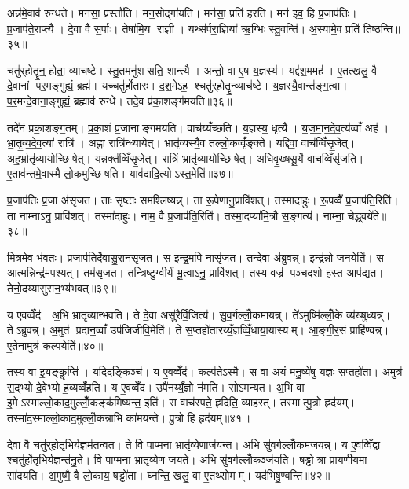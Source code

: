 अन्न॑मे॒वाव॑ रुन्धते। मन॑सा॒ प्रस्तौ॑ति। मन॒सोद्गा॑यति। मन॑सा॒ प्रति॑ हरति। मन॑ इव॒ हि प्र॒जाप॑तिः। प्र॒जाप॑ते॒राप्त्यै। दे॒वा वै स॒र्पाः। तेषा॑मि॒य राज्ञी। यथ्स॑र्परा॒ज्ञिया॑ ऋ॒ग्भिः स्तु॒वन्ति॑। अ॒स्यामे॒व प्रति॑ तिष्ठन्ति॥३५॥

चतु॑र्‌होतॄ॒न्॒ होता॒ व्याच॑ष्टे। स्तु॒तमनु॑शसति॒ शान्त्यै। अन्तो॒ वा ए॒ष य॒ज्ञस्य॑। यद्द॑श॒ममह॑। ए॒तत्खलु॒ वै दे॒वानां पर॒मङ्गुह्यं॒ ब्रह्म॑। यच्चतु॑र्होतारः। द॒श॒मेऽह॒ श्चतु॑र्‌होतॄ॒न्व्याच॑ष्टे। य॒ज्ञस्यै॒वान्त॑ङ्ग॒त्वा। प॒र॒मन्दे॒वाना॒ङ्गुह्यं॒ ब्रह्माव॑ रुन्धे। तदे॒व प्र॑का॒शङ्ग॑मयति॥३६॥

तदे॑नं प्रका॒शङ्ग॒तम्। प्र॒का॒शं प्र॒जानाङ्गमयति। वाच॑य्यँच्छति। य॒ज्ञस्य॒ धृत्यै। य॒ज॒मा॒न॒दे॒व॒त्य॑व्वाँ अह॑। भ्रा॒तृ॒व्य॒दे॒व॒त्या॑ रात्रि॑। अह्ना॒ रात्रि॑न्ध्यायेत्। भ्रातृ॑व्यस्यै॒व तल्लो॒कव्वृँ॑ङ्क्ते। यद्दिवा॒ वाच॑व्विँसृ॒जेत्। अह॒र्भ्रातृ॑व्या॒योच्छिषेत्। यन्नक्त॑व्विँसृ॒जेत्। रात्रिं॒ भ्रातृ॑व्या॒योच्छिषेत्। अ॒धि॒वृ॒ख्ष॒सू॒र्ये वाच॒व्विँसृ॑जति। ए॒ताव॑न्तमे॒वास्मै॑ लो॒कमुच्छिषति। याव॑दादि॒त्योऽस्त॒मेति॑॥३७॥\anuvakamend[पृश्ञि॑ तिष्ठन्ति गमयति शिषे॒त्पञ्च॑ च]

प्र॒जाप॑तिः प्र॒जा अ॑सृजत। ताः सृ॒ष्टाः सम॑श्लिष्यन्न्। ता रू॒पेणानु॒प्रावि॑शत्। तस्मा॑दाहुः। रू॒पव्वैँ प्र॒जाप॑ति॒रिति॑। ता नाम्नाऽनु॒ प्रावि॑शत्। तस्मा॑दाहुः। नाम॒ वै प्र॒जाप॑ति॒रिति॑। तस्मा॒दप्या॑मि॒त्रौ स॒ङ्गत्य॑। नाम्ना॒ चेद्ध्वये॑ते॥३८॥

मि॒त्रमे॒व भ॑वतः। प्र॒जाप॑तिर्देवासु॒रान॑सृजत। स इन्द्र॒मपि॒ नासृ॑जत। तन्दे॒वा अ॑ब्रुवन्न्। इन्द्र॑न्नो जन॒येति॑। स आ॒त्मन्निन्द्र॑मपश्यत्। तम॑सृजत। तन्त्रि॒ष्टुग्वी॒र्यं॑ भू॒त्वाऽनु॒ प्रावि॑शत्। तस्य॒ वज्र॑ पञ्चद॒शो हस्त॒ आप॑द्यत। तेनो॒दय्यासु॑रान॒भ्य॑भवत्॥३९॥

य ए॒वव्वेँद॑। अ॒भि भ्रातृ॑व्यान्भवति। ते दे॒वा असु॑रैर्वि॒जित्य॑। सु॒व॒र्गल्लोँ॒कमा॑यन्न्। ते॑ऽमुष्मि॑ल्लोँ॒के व्य॑ख्षुध्यन्न्। तेऽब्रुवन्न्। अ॒मुत॑ प्रदान॒व्वाँ उप॑जिजीवि॒मेति॑। ते स॒प्तहो॑तारय्यँ॒ज्ञव्विँ॒धाया॒यास्यम्। आ॒ङ्गी॒र॒सं प्राहि॑ण्वन्न्। ए॒तेना॒मुत्र॑ कल्प॒येति॑॥४०॥

तस्य॒ वा इ॒यङ्कॢप्ति॑। यदि॒दङ्किञ्च॑। य ए॒वव्वेँद॑। कल्प॑तेऽस्मै। स वा अ॒यं म॑नु॒ष्ये॑षु य॒ज्ञः स॒प्तहो॑ता। अ॒मुत्र॑ स॒द्भ्यो दे॒वेभ्यो॑ ह॒व्यव्वँ॑हति। य ए॒वव्वेँद॑। उपै॑नय्यँ॒ज्ञो न॑मति। सो॑ऽमन्यत। अ॒भि वा इ॒मेऽस्माल्लो॒काद॒मुल्लोँ॒कङ्क॑मिष्यन्त॒ इति॑। स वाच॑स्पते॒ हृदिति॒ व्याह॑रत्। तस्मात्पु॒त्रो हृद॑यम्। तस्मा॑द॒स्माल्लो॒काद॒मुल्लोँ॒कन्नाभि का॑मयन्ते। पु॒त्रो हि हृद॑यम्॥४१॥\anuvakamend[ह्वये॑ते अभवत्कल्प॒येतीति॑ च॒त्वारि॑ च]

दे॒वा वै चतु॑र्‌होतृभिर्य॒ज्ञम॑तन्वत। ते वि पा॒प्मना॒ भ्रातृ॑व्ये॒णाज॑यन्त। अ॒भि सु॑व॒र्गल्लोँ॒कम॑जयन्न्। य ए॒वव्विँ॒द्वा श्चतु॑र्होतृभिर्य॒ज्ञन्त॑नु॒ते। वि पा॒प्मना॒ भ्रातृ॑व्येण जयते। अ॒भि सु॑व॒र्गल्लोँ॒कञ्ज॑यति। षड्ढोत्रा प्राय॒णीय॒मा सा॑दयति। अ॒मुष्मै॒ वै लो॒काय॒ षड्ढो॑ता। घ्नन्ति॒ खलु॒ वा ए॒तथ्सोमम्। यद॑भिषु॒ण्वन्ति॑॥४२॥

